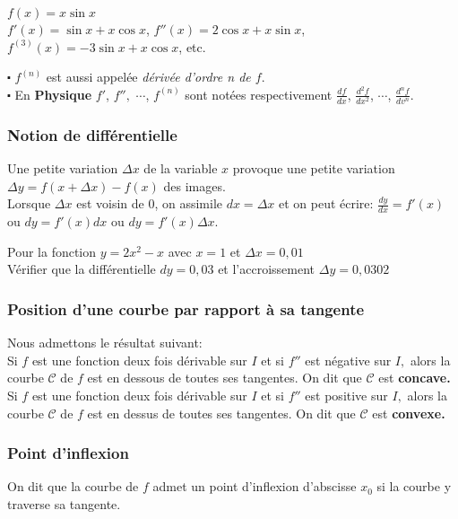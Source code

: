   \begin{example}
 $ f(x)= x\sin x $ \\
 $ f'(x)=\sin x+x\cos x $, $ f''(x)=2\cos x+x\sin x $, $ f^{(3)}(x)=-3\sin x+x\cos x $, etc.
  \end{example}
   \begin{remark}
 $ \centerdot $ $ f^{(n)}$ est aussi appelée \emph{dérivée d'ordre n de $ f. $} \\
  $ \centerdot $ En \textbf{\color{magenta}Physique} $f' $, $ f'', $ $\cdots$, $ f^{(n)}$ sont notées respectivement $\frac{df}{dx} $, $ \frac{d^{2}f}{dx^{2}} $, $\cdots$, $ \frac{d^{n}f}{dv^{n}}$.
 \end{remark}
\subsubsection*{Notion de différentielle}
Une petite variation $ \Delta x $ de la variable $ x $ provoque une petite variation  $ \Delta y = f(x+ \Delta x)-f(x) $ des images.\\ Lorsque $ \Delta x $ est voisin de $ 0 $, on assimile $ dx=\Delta x $ et on peut écrire: $ \frac{dy}{dx} =f'(x)$ ou $ dy=f'(x)dx $ ou $ dy=f'(x)\Delta x $.
\begin{example}
 Pour la fonction $ y=2x^2-x $ avec $x=1 $  et $\Delta x= 0,01 $ \\ Vérifier que la différentielle $dy=0,03  $ et l'accroissement $ \Delta y= 0,0302 $
\end{example}
\subsubsection*{Position d'une courbe par rapport à sa tangente}
  Nous admettons le résultat suivant:\\ Si $ f $ est une fonction deux fois dérivable sur $ I $ et si $ f'' $ est négative sur $ I, $ alors la courbe $\mathcal{C} $ de $ f$ est en dessous de toutes ses tangentes. On dit  que  $\mathcal{C} $ est \textbf{\color{magenta} concave.}\\
   Si $ f $ est une fonction deux fois dérivable sur $ I $ et si $ f'' $ est positive sur $ I, $ alors la courbe $\mathcal{C} $ de $ f$ est en dessus de toutes ses tangentes. On dit  que  $\mathcal{C} $ est \textbf{\color{magenta} convexe.}
  \subsubsection*{Point d'inflexion}
  \begin{definition}
  On dit que la courbe de $ f $ admet un point d'inflexion d'abscisse $ x_{0} $ si la courbe y traverse sa tangente.
  \end{definition}


